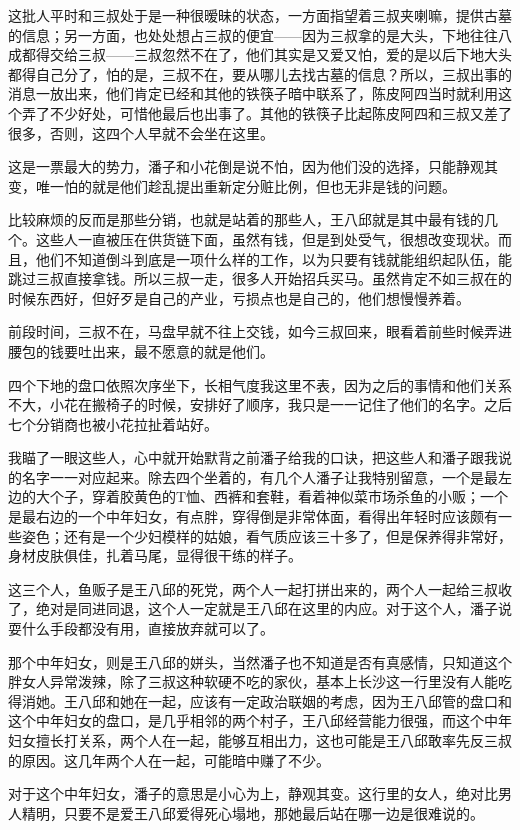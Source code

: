 这批人平时和三叔处于是一种很暧昧的状态，一方面指望着三叔夹喇嘛，提供古墓的信息；另一方面，也处处想占三叔的便宜——因为三叔拿的是大头，下地往往八成都得交给三叔——三叔忽然不在了，他们其实是又爱又怕，爱的是以后下地大头都得自己分了，怕的是，三叔不在，要从哪儿去找古墓的信息？所以，三叔出事的消息一放出来，他们肯定已经和其他的铁筷子暗中联系了，陈皮阿四当时就利用这个弄了不少好处，可惜他最后也出事了。其他的铁筷子比起陈皮阿四和三叔又差了很多，否则，这四个人早就不会坐在这里。

这是一票最大的势力，潘子和小花倒是说不怕，因为他们没的选择，只能静观其变，唯一怕的就是他们趁乱提出重新定分赃比例，但也无非是钱的问题。

比较麻烦的反而是那些分销，也就是站着的那些人，王八邱就是其中最有钱的几个。这些人一直被压在供货链下面，虽然有钱，但是到处受气，很想改变现状。而且，他们不知道倒斗到底是一项什么样的工作，以为只要有钱就能组织起队伍，能跳过三叔直接拿钱。所以三叔一走，很多人开始招兵买马。虽然肯定不如三叔在的时候东西好，但好歹是自己的产业，亏损点也是自己的，他们想慢慢养着。

前段时间，三叔不在，马盘早就不往上交钱，如今三叔回来，眼看着前些时候弄进腰包的钱要吐出来，最不愿意的就是他们。

四个下地的盘口依照次序坐下，长相气度我这里不表，因为之后的事情和他们关系不大，小花在搬椅子的时候，安排好了顺序，我只是一一记住了他们的名字。之后七个分销商也被小花拉扯着站好。

我瞄了一眼这些人，心中就开始默背之前潘子给我的口诀，把这些人和潘子跟我说的名字一一对应起来。除去四个坐着的，有几个人潘子让我特别留意，一个是最左边的大个子，穿着胶黄色的T恤、西裤和套鞋，看着神似菜市场杀鱼的小贩；一个是最右边的一个中年妇女，有点胖，穿得倒是非常体面，看得出年轻时应该颇有一些姿色；还有是一个少妇模样的姑娘，看气质应该三十多了，但是保养得非常好，身材皮肤俱佳，扎着马尾，显得很干练的样子。

这三个人，鱼贩子是王八邱的死党，两个人一起打拼出来的，两个人一起给三叔收了，绝对是同进同退，这个人一定就是王八邱在这里的内应。对于这个人，潘子说耍什么手段都没有用，直接放弃就可以了。

那个中年妇女，则是王八邱的姘头，当然潘子也不知道是否有真感情，只知道这个胖女人异常泼辣，除了三叔这种软硬不吃的家伙，基本上长沙这一行里没有人能吃得消她。王八邱和她在一起，应该有一定政治联姻的考虑，因为王八邱管的盘口和这个中年妇女的盘口，是几乎相邻的两个村子，王八邱经营能力很强，而这个中年妇女擅长打关系，两个人在一起，能够互相出力，这也可能是王八邱敢率先反三叔的原因。这几年两个人在一起，可能暗中赚了不少。

对于这个中年妇女，潘子的意思是小心为上，静观其变。这行里的女人，绝对比男人精明，只要不是爱王八邱爱得死心塌地，那她最后站在哪一边是很难说的。

